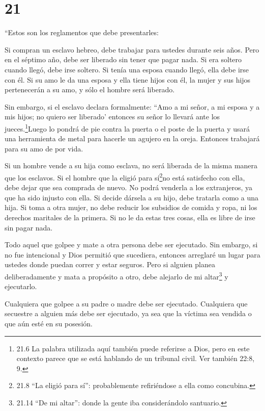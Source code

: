 \hypertarget{section-20}{%
\section{21}\label{section-20}}

 ``Estos son los reglamentos que debe presentarles:

 Si compran un esclavo hebreo, debe trabajar para ustedes
durante seis años. Pero en el séptimo año, debe ser liberado sin tener
que pagar nada.  Si era soltero cuando llegó, debe irse
soltero. Si tenía una esposa cuando llegó, ella debe irse con él.
 Si su amo le da una esposa y ella tiene hijos con él, la
mujer y sus hijos pertenecerán a su amo, y sólo el hombre será liberado.

 Sin embargo, si el esclavo declara formalmente: ``Amo a mi
señor, a mi esposa y a mis hijos; no quiero ser liberado' 
entonces su señor lo llevará ante los jueces.\footnote{21.6 La palabra
  utilizada aquí también puede referirse a Dios, pero en este contexto
  parece que se está hablando de un tribunal civil. Ver también 22:8, 9.}Luego
lo pondrá de pie contra la puerta o el poste de la puerta y usará una
herramienta de metal para hacerle un agujero en la oreja. Entonces
trabajará para su amo de por vida.

 Si un hombre vende a su hija como esclava, no será liberada
de la misma manera que los esclavos.  Si el hombre que la
eligió para sí\footnote{21.8 ``La eligió para sí'': probablemente
  refiriéndose a ella como concubina.}no está satisfecho con ella, debe
dejar que sea comprada de nuevo. No podrá venderla a los extranjeros, ya
que ha sido injusto con ella.  Si decide dársela a su hijo,
debe tratarla como a una hija.  Si toma a otra mujer, no
debe reducir los subsidios de comida y ropa, ni los derechos maritales
de la primera.  Si no le da estas tres cosas, ella es libre
de irse sin pagar nada.

 Todo aquel que golpee y mate a otra persona debe ser
ejecutado.  Sin embargo, si no fue intencional y Dios
permitió que sucediera, entonces arreglaré un lugar para ustedes donde
puedan correr y estar seguros.  Pero si alguien planea
deliberadamente y mata a propósito a otro, debe alejarlo de mi
altar\footnote{21.14 ``De mi altar'': donde la gente iba considerándolo
  santuario.} y ejecutarlo.

 Cualquiera que golpee a su padre o madre debe ser
ejecutado.  Cualquiera que secuestre a alguien más debe ser
ejecutado, ya sea que la víctima sea vendida o que aún esté en su
posesión.

